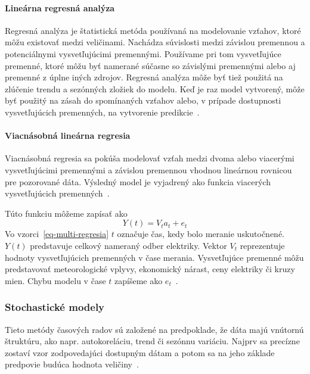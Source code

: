 \documentclass[a4paper,slovak,12pt,appendix]{article}
\begin{document}
\paragraph{Lineárna regresná analýza}
Regresná analýza je štatistická metóda používaná na modelovanie vzťahov, ktoré
môžu existovať medzi veličinami. Nachádza súvislosti medzi závislou premennou
a potenciálnymi vysvetľujúcimi premennými. Používame pri tom vysvetľujúce
premenné, ktoré môžu byť namerané súčasne so závislými premennými alebo aj
premenné z úplne iných zdrojov. Regresná analýza môže byť tiež použitá
na zlúčenie trendu a sezónných zložiek do modelu. Keď je raz model vytvorený,
môže byť použitý na zásah do spomínaných vzťahov alebo, v prípade  dostupnosti
vysvetľujúcich premenných, na vytvorenie predikcie~\cite{Liu1992}.

\paragraph{Viacnásobná lineárna regresia}
Viacnásobná regresia sa pokúša modelovať vzťah medzi dvoma alebo viacerými
vysvetľujúcimi premennými a závislou premennou vhodnou lineárnou rovnicou pre
pozorované dáta. Výsledný model je vyjadrený ako funkcia viacerých
vysvetľujúcich premenných~\cite{Grmanova2016}.

Túto funkciu môžeme zapísať ako
\begin{equation}
  Y(t) = V_t a_t + e_t
  \label{eq-multi-regresia}
\end{equation}
Vo vzorci~\ref{eq-multi-regresia} $t$ označuje čas, kedy bolo meranie
uskutočnené. $Y(t)$ predstavuje celkový nameraný odber elektriky. Vektor $V_t$
reprezentuje hodnoty vysvetľujúcich premenných v čase merania. Vysvetľujúce
premenné môžu predstavovať meteorologické vplyvy, ekonomický nárast, ceny
elektriky či kruzy mien. Chybu modelu v čase $t$ zapíšeme
ako $e_t$~\cite{KumarSingh2013}.


\subsubsection{Stochastické modely}
Tieto metódy časových radov sú založené na predpoklade, že dáta majú vnútornú
štruktúru, ako napr. autokoreláciu, trend či sezónnu variáciu. Najprv sa
precízne zostaví vzor zodpovedajúci dostupným dátam a potom sa na jeho základe
predpovie budúca hodnota veličiny~\cite{KumarSingh2013}.
\end{document}
